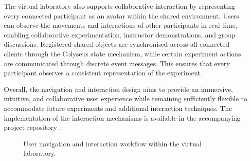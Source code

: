 The virtual laboratory also supports collaborative interaction by representing every connected participant as an avatar within the shared environment. Users can observe the movements and interactions of other participants in real time, enabling collaborative experimentation, instructor demonstrations, and group discussions. Registered shared objects are synchronised across all connected clients through the Colyseus state mechanism, while certain experiment actions are communicated through discrete event messages. This ensures that every participant observes a consistent representation of the experiment.

Overall, the navigation and interaction design aims to provide an immersive, intuitive, and collaborative user experience while remaining sufficiently flexible to accommodate future experiments and additional interaction techniques. The implementation of the interaction mechanisms is available in the accompanying project repository \cite{thesisRepo}.


\begin{figure}[H]
\centering
{}

\caption{User navigation and interaction workflow within the virtual laboratory.}
\label{fig:user_interaction}
\end{figure}

